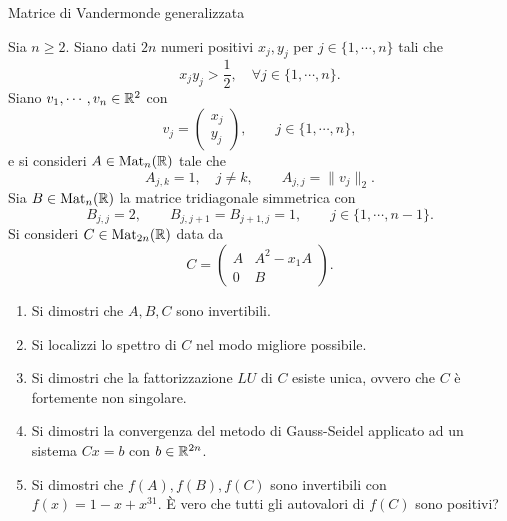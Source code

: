 \documentclass[a4paper]{article}
\begin{document}
\begin{snippetsolution}{Matrice di Vandermonde generalizzata}
    \todo
\end{snippetsolution}

\begin{snippetexercise}{}
    Sia \(n \geq 2\).
    Siano dati \(2n\) numeri positivi \(x_j, y_j\)
    per \(j \in \{1, \cdots, n\}\) tali che
    \[
        x_jy_j > \frac12, \quad \forall j \in \{1, \cdots, n\}.
    \]
    Siano \(v_1, \cdots, v_n \in \mathbb{R}^2\)
    con
    \[
        v_j =
        \begin{pmatrix}
            x_j \\ y_j
        \end{pmatrix},
        \qquad j \in \{1, \cdots, n\},
    \]
    e si consideri \(A \in \operatorname{Mat}_n(\mathbb{R})\) tale che
    \[
        A_{j,k} = 1, \quad j\neq k,
        \qquad
        A_{j,j} = \|v_j\|_2.
    \]
    Sia \(B \in \operatorname{Mat}_n(\mathbb{R})\)
    la matrice tridiagonale simmetrica con
    \[
        B_{j,j} = 2,
        \qquad
        B_{j,j+1} = B_{j+1,j} = 1,
        \qquad j \in \{1, \cdots, n-1\}.
    \]
    Si consideri \(C \in \operatorname{Mat}_{2n}(\mathbb{R})\)
    data da
    \[
        C =
        \begin{pmatrix}
            A & A^2 - x_1A \\
            0 & B
        \end{pmatrix}.
    \]
    \begin{enumerate}
        \item Si dimostri che \(A,B,C\) sono invertibili.
        \item Si localizzi lo spettro di \(C\) nel modo migliore possibile.
        \item Si dimostri che la fattorizzazione \(LU\) di \(C\) esiste unica,
            ovvero che \(C\) è fortemente non singolare.
        \item Si dimostri la convergenza del metodo di Gauss-Seidel applicato ad un sistema \(Cx=b\) con \(b \in \mathbb{R}^{2n}\).
        \item Si dimostri che \(f(A), f(B), f(C)\) sono invertibili con \(f(x) = 1 - x + x^{31}\).
            È vero che tutti gli autovalori di \(f(C)\) sono positivi?
    \end{enumerate}
\end{snippetexercise}
\end{document}
